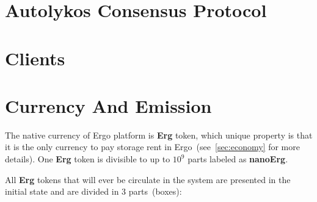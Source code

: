 \documentclass[]{article}
\newcommand{\Ergo}{Ergo}
\newcommand{\Erg}{\textbf{Erg}}
\newcommand{\nanoErg}{\textbf{nanoErg}}
\begin{document}
    \section{Autolykos Consensus Protocol}
    \label{sec:autolykos}


    \section{Clients}
    \label{sec:clients}



    \section{Currency And Emission}
    \label{sec:currency}


    The native currency of \Ergo{} platform is \Erg{} token, which unique property is
    that it is the only currency to pay storage rent in \Ergo{}~(see~\ref{sec:economy} for more details).
    One \Erg{} token is divisible to up to $10^9$ parts labeled as \nanoErg{}.

    All \Erg{} tokens that will ever be circulate in the system are presented in the
    initial state and are divided in 3 parts~(boxes):
\end{document}

